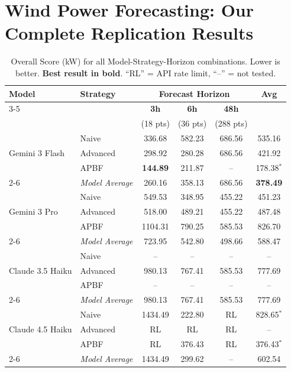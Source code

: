 \documentclass{article}
\begin{document}
\section*{Wind Power Forecasting: Our Complete Replication Results}

\begin{table}[h!]
\centering
\caption{Overall Score (kW) for all Model-Strategy-Horizon combinations. Lower is better. \textbf{Best result in bold}. ``RL'' = API rate limit, ``--'' = not tested.}
\label{tab:complete_results}
\small
\begin{tabular}{llcccc}
\toprule
\multirow{2}{*}{\textbf{Model}} & \multirow{2}{*}{\textbf{Strategy}} & \multicolumn{3}{c}{\textbf{Forecast Horizon}} & \multirow{2}{*}{\textbf{Avg}} \\
\cmidrule{3-5}
& & \textbf{3h} & \textbf{6h} & \textbf{48h} & \\
& & (18 pts) & (36 pts) & (288 pts) & \\
\midrule
\multirow{3}{*}{Gemini 3 Flash}
& Naive    & 336.68 & 582.23 & 686.56 & 535.16 \\
& Advanced & 298.92 & 280.28 & 686.56 & 421.92 \\
& APBF     & \textbf{144.89} & 211.87 & -- & 178.38$^*$ \\
\cmidrule{2-6}
& \textit{Model Average} & 260.16 & 358.13 & 686.56 & \textbf{378.49} \\
\midrule
\multirow{3}{*}{Gemini 3 Pro}
& Naive    & 549.53 & 348.95 & 455.22 & 451.23 \\
& Advanced & 518.00 & 489.21 & 455.22 & 487.48 \\
& APBF     & 1104.31 & 790.25 & 585.53 & 826.70 \\
\cmidrule{2-6}
& \textit{Model Average} & 723.95 & 542.80 & 498.66 & 588.47 \\
\midrule
\multirow{3}{*}{Claude 3.5 Haiku}
& Naive    & -- & -- & -- & -- \\
& Advanced & 980.13 & 767.41 & 585.53 & 777.69 \\
& APBF     & -- & -- & -- & -- \\
\cmidrule{2-6}
& \textit{Model Average} & 980.13 & 767.41 & 585.53 & 777.69 \\
\midrule
\multirow{3}{*}{Claude 4.5 Haiku}
& Naive    & 1434.49 & 222.80 & RL & 828.65$^*$ \\
& Advanced & RL & RL & RL & -- \\
& APBF     & RL & 376.43 & RL & 376.43$^*$ \\
\cmidrule{2-6}
& \textit{Model Average} & 1434.49 & 299.62 & -- & 602.54 \\

\end{tabular}
\end{table}
\end{document}

